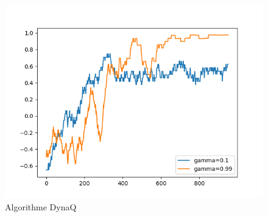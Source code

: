 \documentclass{standalone}
\begin{document}
\begin{figure}[!ht]
	\center
	\includegraphics[scale=0.7]{img/dynaq.png}
	\caption{Algorithme DynaQ}
	\label{ql:dynaq}
\end{figure}
\end{document}
